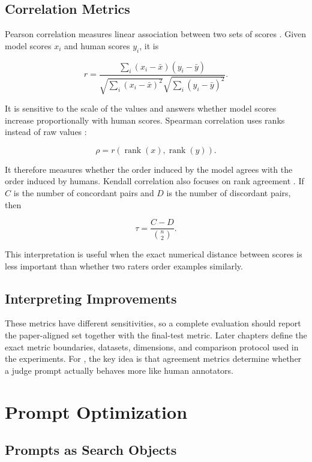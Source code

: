 \documentclass[12pt,a4paper,twoside,openright]{book}
\begin{document}
\subsection{Correlation Metrics}

Pearson correlation measures linear association between two sets of scores
\cite{pearson1895}. Given model scores $x_i$ and human scores $y_i$, it is

\[
r =
\frac{\sum_i (x_i-\bar{x})(y_i-\bar{y})}
     {\sqrt{\sum_i (x_i-\bar{x})^2}\sqrt{\sum_i (y_i-\bar{y})^2}}.
\]

It is sensitive to the scale of the values and answers whether model scores
increase proportionally with human scores. Spearman correlation uses ranks
instead of raw values \cite{spearman1904}:

\[
\rho = r(\operatorname{rank}(x), \operatorname{rank}(y)).
\]

It therefore measures whether the order induced by the model agrees with the
order induced by humans. Kendall correlation also focuses on rank agreement
\cite{kendall1938}. If $C$ is the number of concordant pairs and $D$ is the
number of discordant pairs, then

\[
\tau = \frac{C-D}{\binom{n}{2}}.
\]

This interpretation is useful when the exact numerical distance between scores
is less important than whether two raters order examples similarly.

\subsection{Interpreting Improvements}

These metrics have different sensitivities, so a complete evaluation should
report the paper-aligned set together with the final-test metric. Later chapters define the exact metric boundaries, datasets, dimensions,
and comparison protocol used in the experiments. For , the key idea is
that agreement metrics determine whether a judge prompt actually behaves more
like human annotators.

\section{Prompt Optimization}

\subsection{Prompts as Search Objects}
\end{document}
